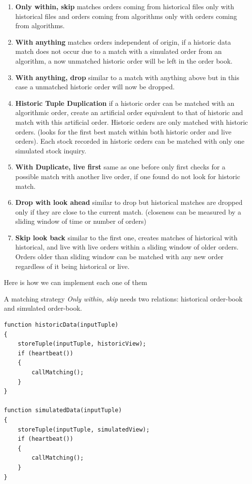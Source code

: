 \documentclass{article}
\begin{document}
\begin{enumerate}
    \item {\bf Only within, skip} matches orders coming from historical files only with historical files and orders coming from algorithms only with orders coming from algorithms.
    \item{\bf With anything} matches orders independent of origin, if a historic data match does not occur due to a match with a simulated order from an algorithm, a now unmatched historic order will be left in the order book. 
    \item{\bf With anything, drop} similar to a match with anything above but in this case a unmatched historic order will now be dropped.
    \item{\bf Historic Tuple Duplication} if a historic order can be matched with an algorithmic order, create an artificial order equivalent to that of historic and match with this artificial order. Historic orders are only matched with historic orders. (looks for the first best match within both historic order and live orders). Each stock recorded in historic orders can be matched with only one simulated stock inquiry.  
    \item{\bf With Duplicate, live first} same as one before only first checks for a possible match with another live order, if one found do not look for historic match. 
    \item{\bf Drop with look ahead} similar to drop but historical matches are dropped only if they are close to the current match. (closeness can be measured by a sliding window of time or number of orders)
    \item{\bf Skip look back} similar to the first one, creates matches of historical with historical, and live with live orders within a sliding window of older orders. Orders older than sliding window can be matched with any new order regardless of it being historical or live.
\end{enumerate}

\noindent Here is how we can implement each one of them

A matching strategy \emph{Only within, skip} needs two relations: historical order-book and simulated order-book.

\begin{verbatim}   
function historicData(inputTuple)
{
    storeTuple(inputTuple, historicView);
    if (heartbeat())
    {
        callMatching();
    }
}

function simulatedData(inputTuple)
{
    storeTuple(inputTuple, simulatedView);
    if (heartbeat())
    {
        callMatching();
    }
}
\end{verbatim}
\end{document}
